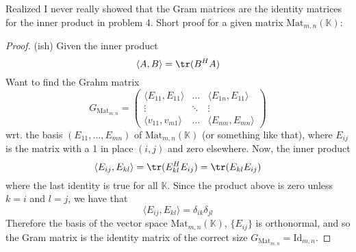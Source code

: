 \documentclass[a4paper,11pt]{article}
\begin{document}
Realized I never really showed that the Gram matrices are the identity matrices for the inner product in problem 4.
Short proof for a given matrix $\text{Mat}_{m, n}(\mathbb{K})$:
\begin{proof}
(ish) Given the inner product 
\[
    \langle A, B \rangle = \tr(B^H A)
\]
Want to find the Grahm matrix
\[
    G_{\text{Mat}_{m, n}} = \begin{pmatrix}
        \langle E_{11}, E_{11} \rangle & \dots & \langle E_{1n}, E_{11} \rangle \\
        \vdots  & \ddots & \vdots \\
        \langle v_{11}, v_{m1} \rangle & \dots & \langle E_{mn}, E_{mn} \rangle
    \end{pmatrix}
\]
wrt. the basis $(E_{11}, \dots, E_{mn})$ of $\text{Mat}_{m, n}(\mathbb{K})$ (or something like that),
where $E_{ij}$ is the matrix with a 1 in place $(i, j)$ and zero elsewhere.
Now, the inner product 
\[
    \langle E_{ij}, E_{kl} \rangle = \tr(E^H_{kl}E_{ij}) = \tr(E_{kl}E_{ij})
\]
where the last identity is true for all $\mathbb{K}$. Since the product above is zero unless $k = i$ and $l = j$,
we have that
\[
    \langle E_{ij}, E_{kl} \rangle = \delta_{ik} \delta_{jl}
\]
Therefore the basis of the vector space $\text{Mat}_{m, n}(\mathbb{K})$, $\{E_{ij}\}$ is orthonormal, and 
so the Gram matrix is the identity matrix of the correct size $G_{\text{Mat}_{m, n}} = \text{Id}_{m, n}$.
\end{proof}
\end{document}

